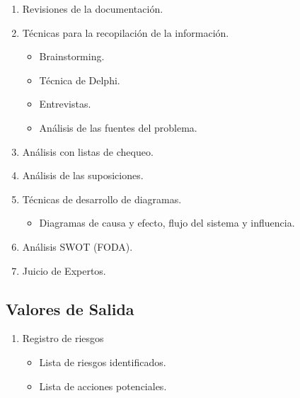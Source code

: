 \begin{enumerate}
    \item Revisiones de la documentación.
    \item Técnicas para la recopilación de la información.
    \begin{itemize}
        \item Brainstorming.
        \item Técnica de Delphi.
        \item Entrevistas.
        \item Análisis de las fuentes del problema.
    \end{itemize}
    \item Análisis con listas de chequeo.
    \item Análisis de las suposiciones.
    \item Técnicas de desarrollo de diagramas.
    \begin{itemize}
        \item Diagramas de causa y efecto, flujo del sistema y influencia.
    \end{itemize}
    \item Análisis SWOT (FODA).
    \item Juicio de Expertos.
\end{enumerate}

\subsection{Valores de Salida}
\begin{enumerate}
    \item Registro de riesgos
    \begin{itemize}
        \item Lista de riesgos identificados.
        \item Lista de acciones potenciales.
    \end{itemize}
\end{enumerate}
